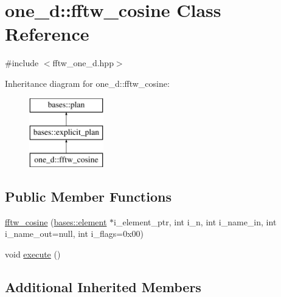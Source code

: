 \hypertarget{classone__d_1_1fftw__cosine}{\section{one\-\_\-d\-:\-:fftw\-\_\-cosine Class Reference}
\label{classone__d_1_1fftw__cosine}
}


 




{\ttfamily \#include $<$fftw\-\_\-one\-\_\-d.\-hpp$>$}

Inheritance diagram for one\-\_\-d\-:\-:fftw\-\_\-cosine\-:\begin{figure}[H]
\begin{center}
\leavevmode
\includegraphics[height=3.000000cm]{classone__d_1_1fftw__cosine}
\end{center}
\end{figure}
\subsection*{Public Member Functions}
\begin{DoxyCompactItemize}
\item 
\hyperlink{classone__d_1_1fftw__cosine_aa74ba6cf6ada1c3a1573137328dbc9a0}{fftw\-\_\-cosine} (\hyperlink{classbases_1_1element}{bases\-::element} $\ast$i\-\_\-element\-\_\-ptr, int i\-\_\-n, int i\-\_\-name\-\_\-in, int i\-\_\-name\-\_\-out=null, int i\-\_\-flags=0x00)
\begin{DoxyCompactList}\small\item\em \end{DoxyCompactList}\item 
void \hyperlink{classone__d_1_1fftw__cosine_aa8b0befe7b047feb004b2c41644a2fa4}{execute} ()
\begin{DoxyCompactList}\small\item\em \end{DoxyCompactList}\end{DoxyCompactItemize}
\subsection*{Additional Inherited Members}


